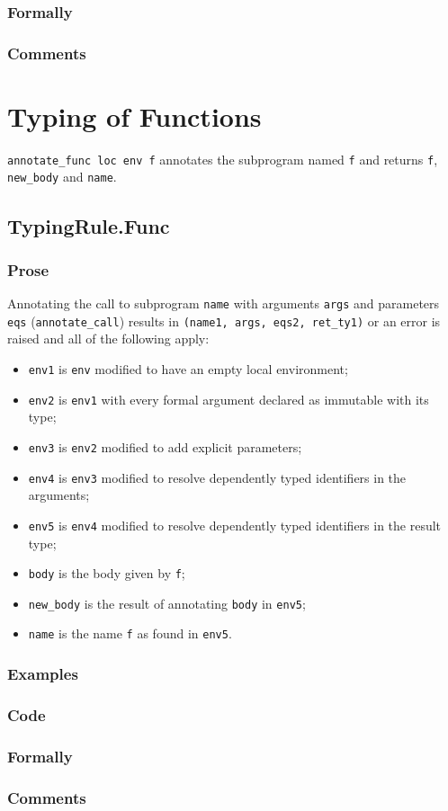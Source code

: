 \documentclass{book}
\begin{document}
  \subsection{Formally}

  \subsection{Comments}


\chapter{Typing of Functions}
\texttt{annotate\_func loc env f} annotates the subprogram named \texttt{f} and returns \texttt{f},
\texttt{new\_body} and \texttt{name}.

\section{TypingRule.Func \label{sec:TypingRule.Func}}

  \subsection{Prose}
  Annotating the call to subprogram \texttt{name} with arguments \texttt{args}
and parameters \texttt{eqs} (\texttt{annotate\_call}) results in
\texttt{(name1, args, eqs2, ret\_ty1)} or an error is raised and all of the following apply:
 \begin{itemize}
 \item \texttt{env1} is \texttt{env} modified to have an empty local environment;
 \item \texttt{env2} is \texttt{env1} with every formal argument declared as immutable with its type;
 \item \texttt{env3} is \texttt{env2} modified to add explicit parameters;
 \item \texttt{env4} is \texttt{env3} modified to resolve dependently typed identifiers in the arguments;
 \item \texttt{env5} is \texttt{env4} modified to resolve dependently typed identifiers in the result type;
 \item \texttt{body} is the body given by \texttt{f};
 \item \texttt{new\_body} is the result of annotating \texttt{body} in \texttt{env5};
 \item \texttt{name} is the name \texttt{f} as found in \texttt{env5}.
 \end{itemize} 

  \subsection{Examples}

  \subsection{Code}

  \subsection{Formally}

    \subsection{Comments}
\end{document}
